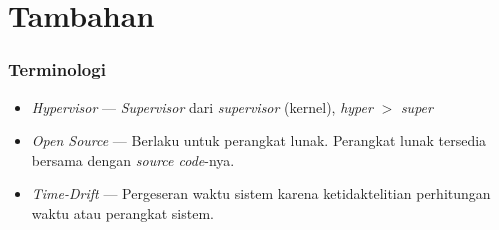 \documentclass[xetex]{beamer}
\begin{document}
\section{Tambahan}
\begin{frame}
	\frametitle{Terminologi}
	\begin{itemize}
		\item \textit{Hypervisor} --- \textit{Supervisor} dari \textit{supervisor} (kernel), \textit{hyper} $>$ \textit{super}
		\item \textit{Open Source} --- Berlaku untuk perangkat lunak. Perangkat lunak tersedia bersama dengan \textit{source code}-nya.
		\item \textit{Time-Drift} --- Pergeseran waktu sistem karena ketidaktelitian perhitungan waktu atau perangkat sistem.
	\end{itemize}
\end{frame}
\end{document}
